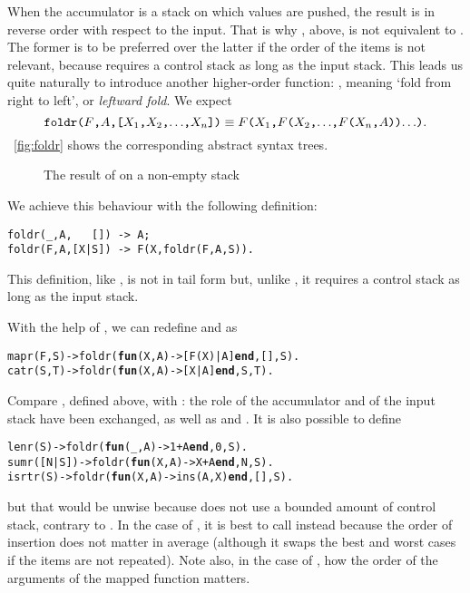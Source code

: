 When the accumulator is a stack on which values are pushed, the result
is in reverse order with respect to the input. That is why
, above, is not equivalent to . The
former is to be preferred over the latter if the order of the items is
not relevant, because  requires a control stack as long
as the input stack. This leads us quite naturally to introduce another
higher\hyp{}order function: , meaning `fold from
right to left', or \emph{leftward fold}. We expect
\begin{equation*}
\texttt{foldr(\(F\),\(A\),[\(X_1\),\(X_2\),\(\ldots\),\(X_{n}\)])}
\equiv
\texttt{\(F\)(\(X_1\),\(F\)(\(X_2\),\(\ldots\),\(F\)(\(X_{n}\),\(A\)))\(\ldots\))}.
\end{equation*}
\Fig~\vref{fig:foldr} shows the corresponding abstract syntax trees.
\begin{figure}[b]
\centering
{}
\qquad
{}
\caption{The result of  on a non\hyp{}empty stack}
\label{fig:foldr}
\end{figure}
We achieve this behaviour with the following definition:
\begin{verbatim}
foldr(_,A,   []) -> A;
foldr(F,A,[X|S]) -> F(X,foldr(F,A,S)).
\end{verbatim}
This definition, like , is not in tail form but,
unlike , it requires a control stack as long as the
input stack.

With the help of , we can redefine 
and  as
\begin{alltt}
mapr(F,S) -> foldr(\textbf{fun}(X,A) -> [F(X)|A] \textbf{end},[],S).
catr(S,T) -> foldr(\textbf{fun}(X,A) ->    [X|A] \textbf{end}, S,T).
\end{alltt}
Compare , defined above, with : the
role of the accumulator and of the input stack have been exchanged, as
well as  and . It is also possible
to define
\begin{alltt}
lenr(S)     -> foldr(\textbf{fun}(\_,A) -> 1+A \textbf{end}, 0,S).\hfill% \emph{Bad}
sumr([N|S]) -> foldr(\textbf{fun}(X,A) -> X+A \textbf{end}, N,S).\hfill% \emph{Bad}
isrtr(S)    -> foldr(\textbf{fun}(X,A) -> ins(A,X) \textbf{end},[],S).\hfill% \emph{Bad}
\end{alltt}
but that would be unwise because  does not use a
bounded amount of control stack, contrary to . In the
case of , it is best to call  instead
because the order of insertion does not matter in average (although it
swaps the best and worst cases if the items are not repeated). Note
also, in the case of , how the order of the arguments
of the mapped function  matters.

